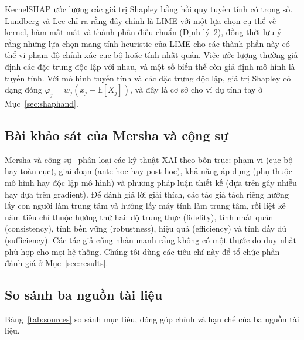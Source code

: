 \documentclass[11pt,a4paper]{article}
\begin{document}
KernelSHAP ước lượng các giá trị Shapley bằng hồi quy tuyến tính có trọng số.
Lundberg và Lee chỉ ra rằng đây chính là LIME với một lựa chọn cụ thể về
kernel, hàm mất mát và thành phần điều chuẩn (Định lý~2), đồng thời lưu ý
rằng những lựa chọn mang tính heuristic của LIME cho các thành phần này có
thể vi phạm độ chính xác cục bộ hoặc tính nhất quán. Việc ước lượng thường
giả định các đặc trưng độc lập với nhau, và một số biến thể còn giả định mô
hình là tuyến tính. Với mô hình tuyến tính và các đặc trưng độc lập, giá trị
Shapley có dạng đóng $\varphi_j = w_j (x_j - \mathbb{E}[X_j])$, và đây là cơ
sở cho ví dụ tính tay ở Mục~\ref{sec:shaphand}.

\subsection{Bài khảo sát của Mersha và cộng sự}
Mersha và cộng sự~\cite{mersha} phân loại các kỹ thuật XAI theo bốn trục:
phạm vi (cục bộ hay toàn cục), giai đoạn (ante-hoc hay post-hoc), khả năng áp
dụng (phụ thuộc mô hình hay độc lập mô hình) và phương pháp luận thiết kế
(dựa trên gây nhiễu hay dựa trên gradient). Để đánh giá lời giải thích, các
tác giả tách riêng hướng lấy con người làm trung tâm và hướng lấy máy tính
làm trung tâm, rồi liệt kê năm tiêu chí thuộc hướng thứ hai: độ trung thực
(fidelity), tính nhất quán (consistency), tính bền vững (robustness), hiệu
quả (efficiency) và tính đầy đủ (sufficiency). Các tác giả cũng nhấn mạnh
rằng không có một thước đo duy nhất phù hợp cho mọi hệ thống. Chúng tôi dùng
các tiêu chí này để tổ chức phần đánh giá ở Mục~\ref{sec:results}.

\subsection{So sánh ba nguồn tài liệu}
Bảng~\ref{tab:sources} so sánh mục tiêu, đóng góp chính và hạn chế của ba
nguồn tài liệu.
\end{document}
